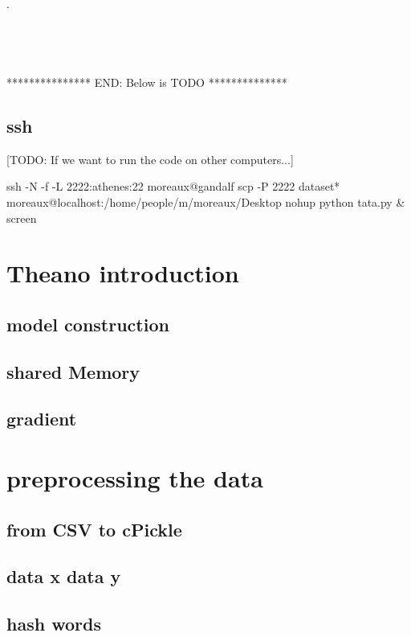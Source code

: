 .\\ \\ \\ \\ \\
*************** END: Below is TODO ************** 
 

	\subsection{ssh}
		[TODO: If we want to run the code on other computers...]

		ssh -N -f -L 2222:athenes:22 moreaux@gandalf 
		scp -P 2222 dataset* moreaux@localhost:/home/people/m/moreaux/Desktop
		nohup python tata.py \&
		screen
		



\section{Theano introduction}
			
	\subsection{model construction}
	\subsection{shared Memory}
	\subsection{gradient}

\section{preprocessing the data}
	\subsection{from CSV to cPickle}
	\subsection{data x data y}
	\subsection{hash words}







